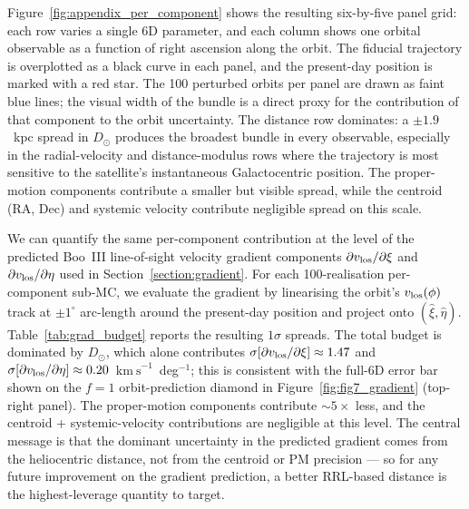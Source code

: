 \documentclass[twocolumn, apj, numberedappendix, appendixfloats]{openjournal_dhayaa}
\newcommand{\vlosUnits}{$\mathrm{km~s}^{-1}$\xspace}
\begin{document}
Figure~\ref{fig:appendix_per_component} shows the resulting six-by-five panel grid: each row varies a single 6D parameter, and each column shows one orbital observable as a function of right ascension along the orbit. The fiducial trajectory is overplotted as a black curve in each panel, and the present-day position is marked with a red star. The 100 perturbed orbits per panel are drawn as faint blue lines; the visual width of the bundle is a direct proxy for the contribution of that component to the orbit uncertainty. The distance row dominates: a $\pm 1.9$~kpc spread in $D_\odot$ produces the broadest bundle in every observable, especially in the radial-velocity and distance-modulus rows where the trajectory is most sensitive to the satellite's instantaneous Galactocentric position. The proper-motion components contribute a smaller but visible spread, while the centroid (RA, Dec) and systemic velocity contribute negligible spread on this scale.

We can quantify the same per-component contribution at the level of the predicted Boo~III line-of-sight velocity gradient components $\partial v_{\rm los}/\partial\xi$ and $\partial v_{\rm los}/\partial\eta$ used in Section~\ref{section:gradient}. For each 100-realisation per-component sub-MC, we evaluate the gradient by linearising the orbit's $v_{\rm los}(\phi)$ track at $\pm 1^\circ$ arc-length around the present-day position and project onto $(\hat\xi, \hat\eta)$. Table~\ref{tab:grad_budget} reports the resulting $1\sigma$ spreads. The total budget is dominated by $D_\odot$, which alone contributes $\sigma[\partial v_{\rm los}/\partial\xi] \approx 1.47$ and $\sigma[\partial v_{\rm los}/\partial\eta] \approx 0.20$~\vlosUnits~deg$^{-1}$; this is consistent with the full-6D error bar shown on the $f=1$ orbit-prediction diamond in Figure~\ref{fig:fig7_gradient} (top-right panel). The proper-motion components contribute $\sim 5\times$ less, and the centroid + systemic-velocity contributions are negligible at this level. The central message is that the dominant uncertainty in the predicted gradient comes from the heliocentric distance, not from the centroid or PM precision --- so for any future improvement on the gradient prediction, a better RRL-based distance is the highest-leverage quantity to target.




{}

\end{document}
